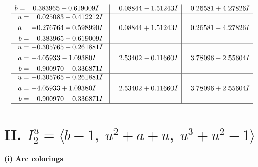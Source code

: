 \documentclass[1p]{elsarticle_modified}
\theoremstyle{definition}
\begin{document}
$$\begin{array}{c|c|c}
\begin{aligned}
b &= \phantom{-}0.383965 + 0.619009 I\end{aligned}
 & \phantom{-}0.08844 - 1.51243 I & \phantom{-}0.26581 + 4.27826 I \\ \hline\begin{aligned}
u &= \phantom{-}0.025083 - 0.412212 I \\
a &= -0.276764 - 0.598990 I \\
b &= \phantom{-}0.383965 - 0.619009 I\end{aligned}
 & \phantom{-}0.08844 + 1.51243 I & \phantom{-}0.26581 - 4.27826 I \\ \hline\begin{aligned}
u &= -0.305765 + 0.261881 I \\
a &= -4.05933 - 1.09380 I \\
b &= -0.900970 + 0.336871 I\end{aligned}
 & \phantom{-}2.53402 - 0.11660 I & \phantom{-}3.78096 - 2.55604 I \\ \hline\begin{aligned}
u &= -0.305765 - 0.261881 I \\
a &= -4.05933 + 1.09380 I \\
b &= -0.900970 - 0.336871 I\end{aligned}
 & \phantom{-}2.53402 + 0.11660 I & \phantom{-}3.78096 + 2.55604 I\\
 \hline 
 \end{array}$$\newpage\newpage\renewcommand{\arraystretch}{1}
\centering \section*{II. $I^u_{2}= \langle b-1,\;u^2+a+u,\;u^3+u^2-1 \rangle$}
\flushleft \textbf{(i) Arc colorings}\\
\end{document}
